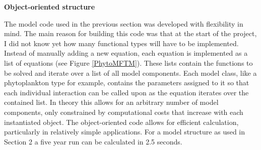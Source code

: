 {\textbf{Object-oriented structure}}

The model code used in the previous section was developed with flexibility in mind. The main reason for building this code was that at the start of the project, I did not know yet how many functional types will have to be implemented. Instead of manually adding a new equation, each equation is implemented as a list of equations (see Figure \ref{PhytoMFTM}). These lists contain the functions to be solved and iterate over a list of all model components. 
Each model class, like a phytoplankton type for example, contains the parameters assigned to it so that each individual interaction can be called upon as the equation iterates over the contained list. In theory this allows for an arbitrary number of model components, only constrained by computational costs that increase with each instantiated object. The object-oriented code allows for efficient calculation, particularly in relatively simple applications. For a model structure as used in Section 2 a five year run can be calculated in 2.5 seconds. 



